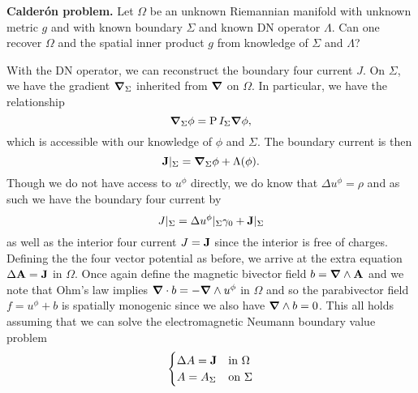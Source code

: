 \vspace*{5pt}
\noindent\textbf{Calder\'on problem.} Let $\Omega$ be an unknown Riemannian manifold with unknown metric $g$ and with known boundary $\Sigma$ and known DN operator $\Lambda$. Can one recover $\Omega$ and the spatial inner product $g$ from knowledge of $\Sigma$ and $\Lambda$?
\vspace*{5pt}

With the DN operator, we can reconstruct the boundary four current $J$.  On $\Sigma$, we have the gradient $\boldsymbol{\nabla}_\Sigma$ inherited from $\boldsymbol{\nabla}$ on $\Omega$.  In particular, we have the relationship
\[
\boldsymbol{\nabla}_\Sigma \phi = \operatorname{P}{I_\Sigma}{\boldsymbol{\nabla} \phi},
\]
which is accessible with our knowledge of $\phi$ and $\Sigma$. The boundary current is then
\[
\mathbf{J}\vert_{\Sigma} = \boldsymbol{\nabla}_\Sigma \phi + \Lambda(\phi).
\]
Though we do not have access to $u^\phi$ directly, we do know that $\Delta u^\phi = \rho$ and as such we have the boundary four current by
\[
J\vert_\Sigma = \Delta u^\phi\vert_\Sigma \gamma_0 + \mathbf{J}\vert_\Sigma
\]
as well as the interior four current $J = \mathbf{J}$ since the interior is free of charges.  Defining the the four vector potential as before, we arrive at the extra equation $\Delta \mathbf{A} = \mathbf{J}$ in $\Omega$. Once again define the magnetic bivector field $b=\boldsymbol{\nabla} \wedge \mathbf{A}$ and we note that Ohm's law implies $\boldsymbol{\nabla} \cdot b = -\boldsymbol{\nabla} \wedge u^\phi$ in $\Omega$ and so the parabivector field $f=u^\phi + b$ is spatially monogenic since we also have $\boldsymbol{\nabla} \wedge b = 0$.  This all holds assuming that we can solve the electromagnetic Neumann boundary value problem
\[
\begin{cases} \Delta A = \mathbf{J} & \textrm{in $\Omega$}\\ A = A_\Sigma & \textrm{on $\Sigma$} \end{cases}
\]


